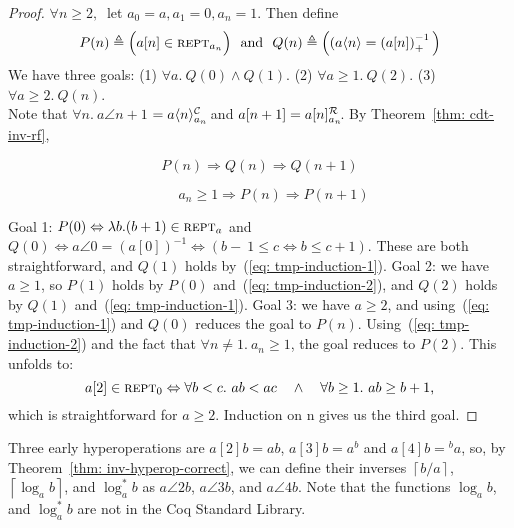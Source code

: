 \begin{proof}
$\forall n \ge 2,~$ let $a_0 = a, a_1 = 0, a_n = 1$. Then define
\begin{equation*}
P(n) \triangleq  \Big(a[n] \in \text{\scshape{rept}}_{a_n}\Big)\ \text{ and } \
Q(n) \triangleq  \Big((a\langle n\rangle = \left(a[n]\right)^{-1}_+ \Big)
\end{equation*}
We have three goals:
(1) $\forall a.~ Q(0) \wedge Q(1)$.
(2) $\forall a \ge 1.~ Q(2)$.
(3) $\forall a \ge 2.~ Q(n)$. \\
Note that \mbox{$\forall n.~ a\angle{n+1}$} $= \cdt{a\angle{n}}{a_n}$ and $a[n+1] = \rf{a[n]}{a_n}$. By Theorem~\ref{thm: cdt-inv-rf},

\vspace*{-1em}
\noindent\begin{minipage}{.45\linewidth}
\begin{equation}
P(n) \Rightarrow Q(n) \Rightarrow Q(n+1) \label{eq: tmp-induction-1}
\end{equation}
\end{minipage}
\begin{minipage}{.55\linewidth}
\begin{equation}
\qquad a_{n} \ge 1 \Rightarrow P(n) \Rightarrow P(n+1) \label{eq: tmp-induction-2}
\end{equation}
\end{minipage}
Goal 1: $P(0) \Leftrightarrow \lambda b.(b+1)\in \text{\scshape{rept}}_a$ and
$Q(0) \iff a\angle{0} = \left(a[0]\right)^{-1} \iff (b-~1\le c \iff b\le c+1)$.
These are both straightforward, and $Q(1)$ holds by~(\ref{eq: tmp-induction-1}). Goal 2: we have $a \ge 1$, so
$P(1)$ holds by $P(0)$ and~(\ref{eq: tmp-induction-2}), and 
$Q(2)$ holds by $Q(1)$ and~(\ref{eq: tmp-induction-1}).
Goal 3: we have $a\ge 2$, and using~(\ref{eq: tmp-induction-1}) and $Q(0)$
reduces the goal to $P(n)$. Using~(\ref{eq: tmp-induction-2}) and the fact that $\forall n \neq 1.~a_n\ge 1$, the goal reduces to $P(2)$. This unfolds to:
\begin{equation*}
a[2]\in \text{\scshape{rept}}_0 \Leftrightarrow \forall b < c.~ab < ac \quad \wedge \quad \forall b \ge 1.~ab \ge b+1\text{,}
\end{equation*}
which is straightforward for $a\ge 2$. Induction on n gives us the third goal.
\end{proof}
\begin{rem}
Three early hyperoperations are $a[2]b = ab$, $a[3]b = a^b$ and \linebreak $a[4]b = \! ^ba$, so, by Theorem~\ref{thm: inv-hyperop-correct}, we can define their inverses $\left\lceil b/a \right\rceil$, $\left\lceil \log_a b \right\rceil$, and $\log^*_a b$ as $a\angle{2}b$, $a\angle{3}b$, and $a\angle{4}b$.
Note that the functions $\log_a b$, and $\log^*_a b$ are not in the Coq Standard Library.
\end{rem}
